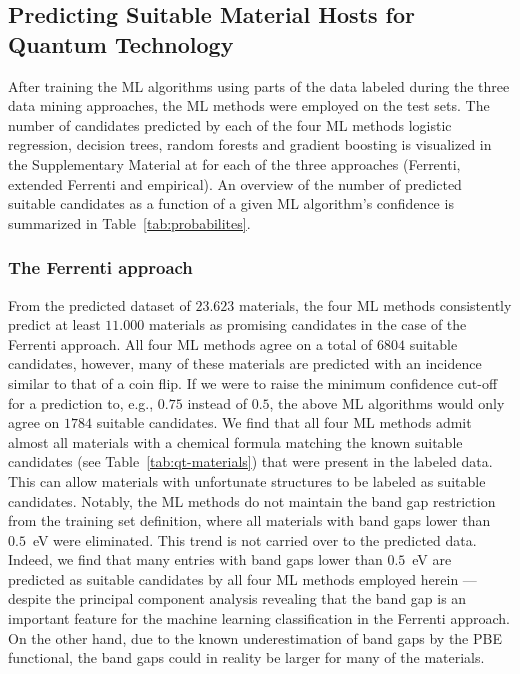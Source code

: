 \documentclass[superscriptaddress,unsortedaddress,
 amsmath,amssymb,
 aps,
]{revtex4-2}
\begin{document}
\subsection*{Predicting Suitable Material Hosts for Quantum Technology} 
After training the ML algorithms using parts of the data labeled during the three data mining approaches, the ML methods were employed on the test sets. 
The number of candidates predicted by each of the four ML methods logistic regression, decision trees, random forests and gradient boosting is visualized in the Supplementary Material at \cite{supplementary} for each of the three approaches (Ferrenti, extended Ferrenti and empirical). 
An overview of the number of predicted suitable candidates as a function of a given ML algorithm's confidence is summarized in  Table~\ref{tab:probabilites}. 

\subsubsection*{The Ferrenti approach}

From the predicted dataset of $23.623$ materials, 
the four ML methods consistently predict at least $11.000$ materials as promising candidates in the case of the Ferrenti approach. All four ML methods agree on a total of $6804$ suitable candidates, however, many of these materials are predicted with an incidence similar to that of a coin flip. If we were to raise the minimum confidence cut-off for a prediction to, e.g., $0.75$ instead of $0.5$, the above ML algorithms would only agree on $1784$ suitable candidates. 
We find that all four ML methods admit almost all materials with a chemical formula matching the known suitable candidates (see Table~\ref{tab:qt-materials}) that were present in the labeled data. This can allow materials with unfortunate structures to be labeled as suitable candidates. Notably, the ML methods do not maintain the band gap restriction from the training set definition, where all materials with band gaps lower than $0.5$~eV were eliminated. 
This trend is not carried over to the predicted data. Indeed, we find that many entries with band gaps lower than $0.5$~eV are predicted as suitable candidates by all four ML methods employed herein 
--- despite the principal component analysis revealing that the band gap is an important feature for the machine learning classification in the Ferrenti approach.  
On the other hand, due to the known underestimation of band gaps by the PBE functional, the band gaps could in reality be larger for many of the materials. 
\end{document}
